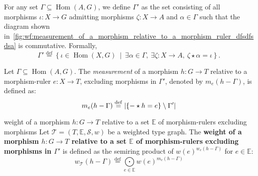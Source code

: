 For any set \( \Gamma \subseteq \operatorname{Hom}(A, G) \),
    we define $\Gamma'$ as the set consisting of all morphisms \( \iota : X \to G \) admitting morphisms \( \zeta \colon X \to A \) and \( \alpha \in \Gamma \) such that the diagram shown in~\autoref{fig:wf:measurement_of_a_morphism_relative_to_a_morphism_ruler_dfsdfsdsa} is commutative.  Formally,  
    \[
    \Gamma' \overset{\operatorname{def}}{=} \left\{ \iota \in \operatorname{Hom}(X, G)~\middle|~\exists \alpha \in \Gamma,~\exists \zeta:X \to A,~\zeta \star \alpha = \iota \right\}. 
    \]
    \begin{figure}[H]
    \centering
    \caption{}
    \label{fig:wf:measurement_of_a_morphism_relative_to_a_morphism_ruler_dfsdfsdsa}
\end{figure} 
    

\begin{definition}
    \label{def:weight_excluding_pre}
    Let \( \Gamma \subseteq \operatorname{Hom}(A, G) \).
    The \emph{measurement} of a morphism \( h:G \to T \) relative to a morphism-ruler \( e: X \to T \), excluding morphisms in \( \Gamma' \), denoted by $m_e(h-\Gamma)$, is defined as:
    \[
        m_e(h-\Gamma) \overset{\operatorname{def}}{=} 
            |\{- \star h = e\} \setminus \Gamma'|
    \]
\end{definition}
\begin{definition}
    \label{def:weight_excluding}
    weight of a morphism $h: G \to T$ relative to a set $\mathbb{E}$ of morphism-rulers excluding morphisms
    Let $\mathcal{T}=(T,\mathbb{E},\mathcal{S},w)$ be a weighted type graph. The \textbf{weight of a morphism $h: G \to T$ relative to a set $\mathbb{E}$ of morphism-rulers excluding morphisms in \( \Gamma' \)} is defined as the semiring product of $w(e)^{w_e(h-\Gamma)}$ for $e \in \mathbb{E}$:
    \[ 
        w_\mathcal{T}(h-\Gamma) \overset{\operatorname{def}}{=} \underset{e \in \mathbb{E}}{\bigodot} 
    w(e)^{m_e(h-\Gamma)}
            \]
\end{definition}

